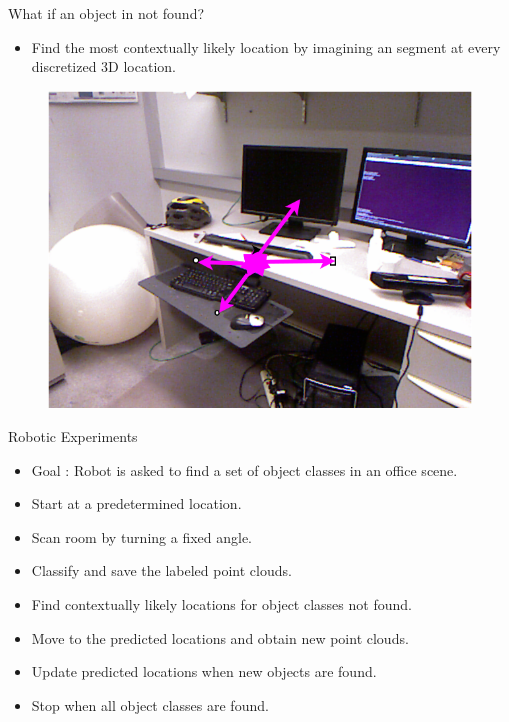 \documentclass{beamer}
\begin{document}
\begin{frame}{What if an object in not found?}
\begin{itemize}
\item Find the most contextually likely location by imagining an segment at every discretized 3D location.
\end{itemize}
 \begin{figure}   
 \includegraphics[scale=0.3]{heatImage.png} 
 \end{figure}

\end{frame}


\begin{frame}{Robotic Experiments}

\begin{itemize}
\item Goal : Robot is asked to find a set of object classes in an office scene.
\item Start at a predetermined location. 
\item Scan room by turning a fixed angle.
\item Classify and save the labeled point clouds. 
\item Find contextually likely locations for object classes not found.
\item Move to the predicted locations and obtain new point clouds.
\item Update predicted locations when new objects are found.
\item Stop when all object classes are found.

\end{itemize}

\end{frame}
\end{document}
